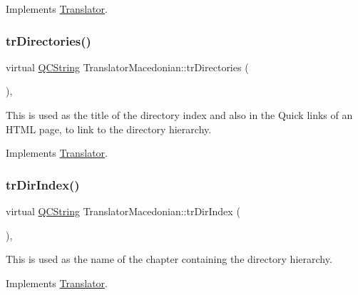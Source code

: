 Implements \mbox{\hyperlink{class_translator}{Translator}}.

\mbox{\label{class_translator_macedonian_adea140dc8193a22ebb270d26d332af19}} 
\subsubsection{\texorpdfstring{trDirectories()}{trDirectories()}}
{\footnotesize\ttfamily virtual \mbox{\hyperlink{class_q_c_string}{Q\+C\+String}} Translator\+Macedonian\+::tr\+Directories (\begin{DoxyParamCaption}{ }\end{DoxyParamCaption})\hspace{0.3cm}{\ttfamily [inline]}, {\ttfamily [virtual]}}

This is used as the title of the directory index and also in the Quick links of an H\+T\+ML page, to link to the directory hierarchy. 

Implements \mbox{\hyperlink{class_translator}{Translator}}.

\mbox{\label{class_translator_macedonian_aa478e1d6f79c12010b298633241baf91}} 
\subsubsection{\texorpdfstring{trDirIndex()}{trDirIndex()}}
{\footnotesize\ttfamily virtual \mbox{\hyperlink{class_q_c_string}{Q\+C\+String}} Translator\+Macedonian\+::tr\+Dir\+Index (\begin{DoxyParamCaption}{ }\end{DoxyParamCaption})\hspace{0.3cm}{\ttfamily [inline]}, {\ttfamily [virtual]}}

This is used as the name of the chapter containing the directory hierarchy. 

Implements \mbox{\hyperlink{class_translator}{Translator}}.

\mbox{\label{class_translator_macedonian_af49ee3467b439e5773824153d8d18c75}} 
